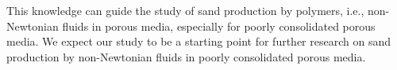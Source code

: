 \documentclass{article}
\begin{document}
This knowledge can guide the study of sand production by polymers, i.e., non-Newtonian fluids in porous media, especially for poorly consolidated porous media. We expect our study to be a starting point for further research on sand production by non-Newtonian fluids in poorly consolidated porous media.



  
\end{document}
